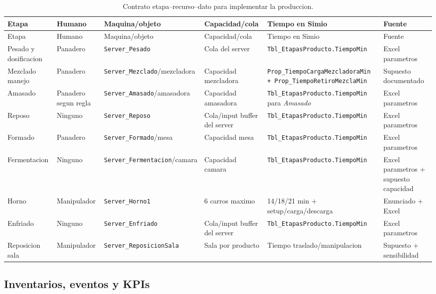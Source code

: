 \documentclass[11pt]{article}
\newcommand{\simio}[1]{\texttt{#1}}
\newcommand{\tabla}[1]{\texttt{#1}}
\newcommand{\state}[1]{\texttt{#1}}
\begin{document}
{\scriptsize
\begin{longtable}{L{2.7cm}L{2.5cm}L{2.7cm}L{2.7cm}L{3.0cm}L{2.6cm}}
\caption{Contrato etapa--recurso--dato para implementar la produccion.}\\
\toprule
{}
\color{white}Etapa & \color{white}Humano & \color{white}Maquina/objeto & \color{white}Capacidad/cola & \color{white}Tiempo en Simio & \color{white}Fuente \\
\midrule
\endfirsthead
\toprule
{}
\color{white}Etapa & \color{white}Humano & \color{white}Maquina/objeto & \color{white}Capacidad/cola & \color{white}Tiempo en Simio & \color{white}Fuente \\
\midrule
\endhead
Pesado y dosificacion & Panadero & \simio{Server\_Pesado} & Cola del server & \tabla{Tbl\_EtapasProducto.TiempoMin} & Excel parametros \\
Mezclado manejo & Panadero & \simio{Server\_Mezclado}/mezcladora & Capacidad mezcladora & \state{Prop\_TiempoCargaMezcladoraMin + Prop\_TiempoRetiroMezclaMin} & Supuesto documentado \\
Amasado & Panadero segun regla & \simio{Server\_Amasado}/amasadora & Capacidad amasadora & \tabla{Tbl\_EtapasProducto.TiempoMin} para \textit{Amasado} & Excel parametros \\
Reposo & Ninguno & \simio{Server\_Reposo} & Cola/input buffer del server & \tabla{Tbl\_EtapasProducto.TiempoMin} & Excel parametros \\
Formado & Panadero & \simio{Server\_Formado}/mesa & Capacidad mesa & \tabla{Tbl\_EtapasProducto.TiempoMin} & Excel parametros \\
Fermentacion & Ninguno & \simio{Server\_Fermentacion}/camara & Capacidad camara & \tabla{Tbl\_EtapasProducto.TiempoMin} & Excel parametros + supuesto capacidad \\
Horno & Manipulador & \simio{Server\_Horno1} & 6 carros maximo & 14/18/21 min + setup/carga/descarga & Enunciado + Excel \\
Enfriado & Ninguno & \simio{Server\_Enfriado} & Cola/input buffer del server & \tabla{Tbl\_EtapasProducto.TiempoMin} & Excel parametros \\
Reposicion sala & Manipulador & \simio{Server\_ReposicionSala} & Sala por producto & Tiempo traslado/manipulacion & Supuesto + sensibilidad \\
\bottomrule
\end{longtable}
}

\subsection{Inventarios, eventos y KPIs}
\end{document}
